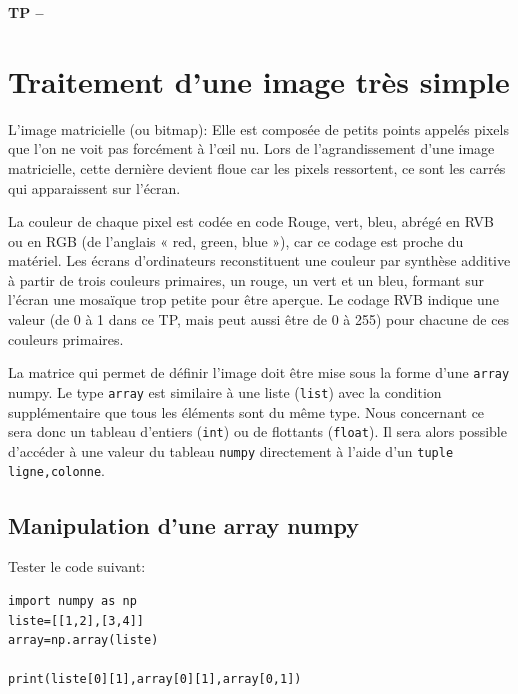 

%





\begin{center}
{\Large\bf TP \no {\numero} -- \descrip}
\end{center}


\section{Traitement d'une image très simple}

L’image matricielle (ou bitmap): Elle est composée de petits points appelés \og pixels \fg que l’on ne voit pas forcément à l’\oe il nu. Lors de l’agrandissement d’une image matricielle, cette dernière devient floue car les pixels ressortent, ce sont les carrés qui apparaissent sur l’écran.

La couleur de chaque pixel est codée en code Rouge, vert, bleu, abrégé en RVB ou en RGB (de l'anglais « red, green, blue »), car ce codage est proche du matériel. Les écrans d'ordinateurs reconstituent une couleur par synthèse additive à partir de trois couleurs primaires, un rouge, un vert et un bleu, formant sur l'écran une mosaïque trop petite pour être aperçue. Le codage RVB indique une valeur (de 0 à 1 dans ce TP, mais peut aussi être de 0 à 255) pour chacune de ces couleurs primaires. 

La matrice qui permet de définir l'image doit être mise sous la forme d'une \verb?array? numpy. Le type \verb?array? est similaire à une liste (\verb?list?) avec la condition supplémentaire que tous les éléments sont du même type. Nous concernant ce sera donc un tableau d’entiers (\verb?int?) ou de flottants (\verb?float?). Il sera alors possible d'accéder à une valeur du tableau \verb?numpy? directement à l'aide d'un \verb?tuple? \verb?ligne,colonne?.

\subsection{Manipulation d'une array numpy}

Tester le code suivant:

\begin{verbatim}
import numpy as np
liste=[[1,2],[3,4]]
array=np.array(liste)

print(liste[0][1],array[0][1],array[0,1])
\end{verbatim}



